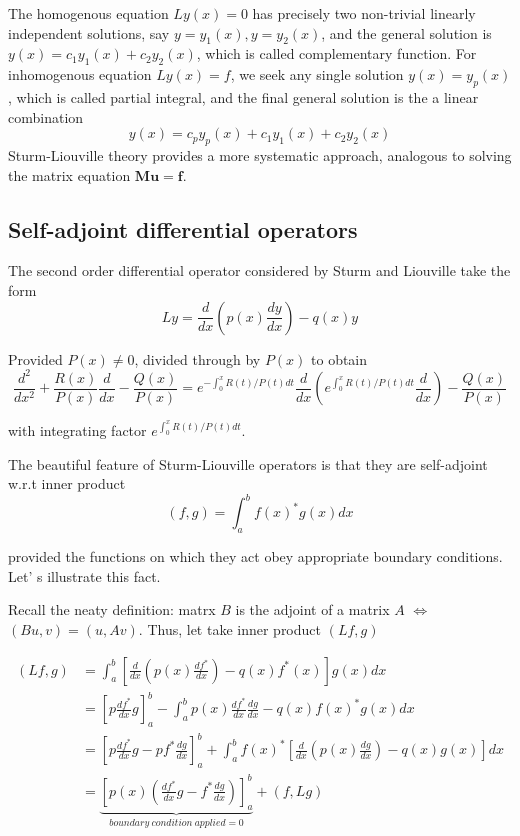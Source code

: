 \documentclass{article}
\theoremstyle{definition}
\begin{document}
The homogenous equation $Ly(x)=0$ has precisely two non-trivial linearly independent solutions, say $y=y_1(x),y=y_2(x)$, and the general solution is $y(x)=c_1y_1(x)+c_2y_2(x)$, which is called complementary function. For inhomogenous equation $Ly(x)=f$, we seek any single solution $y(x)=y_p(x)$, which is called partial integral, and the final general solution is the a linear combination 
\begin{equation}
y(x)=c_py_p(x)+c_1y_1(x)+c_2y_2(x)
\end{equation}
Sturm-Liouville theory provides a more systematic approach, analogous to solving the matrix equation $\mathbf{Mu=f}$.


\subsection{Self-adjoint differential operators}
The second order differential operator considered by Sturm and Liouville take the form
\begin{equation}
Ly=\frac{d}{dx}\left(p(x)\frac{dy}{dx}\right)-q(x)y
\end{equation}

Provided $P(x)\neq 0$, divided through by $P(x)$ to obtain
\begin{equation}
\frac{d^2}{dx^2}+\frac{R(x)}{P(x)}\frac{d}{dx}-\frac{Q(x)}{P(x)}=e^{-\int_0^x R(t)/P(t)dt}\frac{d}{dx}\left(e^{\int_0^x R(t)/P(t)dt}\frac{d}{dx}\right)-\frac{Q(x)}{P(x)}
\end{equation}

with integrating factor $e^{\int_0^x R(t)/P(t)dt}$. 


The beautiful feature of Sturm-Liouville operators is that they are self-adjoint w.r.t inner product 
\begin{equation}
(f,g)=\int_a^bf(x)^{*}g(x)dx
\end{equation}


provided the functions on which they act obey appropriate boundary conditions. Let' s illustrate this fact.

Recall the neaty definition: matrx $B$ is the adjoint of a matrix $A$ $\iff$ $(Bu,v)=(u,Av)$. Thus, let take inner product $(Lf,g)$

\begin{align}
(Lf,g)&=\int_a^b\left[\frac{d}{dx}(p(x)\frac{df^*}{dx})-q(x)f^*(x)\right]g(x)dx\\
	  &=\left[p\frac{df^*}{dx}g\right]_a^b-\int_a^b p(x)\frac{df^*}{dx}\frac{dg}{dx}-q(x)f(x)^*g(x)dx\\
	  &=\left[p\frac{df^*}{dx}g-pf^*\frac{dg}{dx}\right]_a^b+\int_a^bf(x)^*\left[\frac{d}{dx}\left(p(x)\frac{dg}{dx}\right)-q(x)g(x)\right]dx\\
	  &=\underbrace{\left[p(x)\left(\frac{df^*}{dx}g-f^*\frac{dg}{dx}\right)\right]_a^b}_{boundary \ condition \ applied =0}+(f,Lg)
\end{align}
\end{document}

